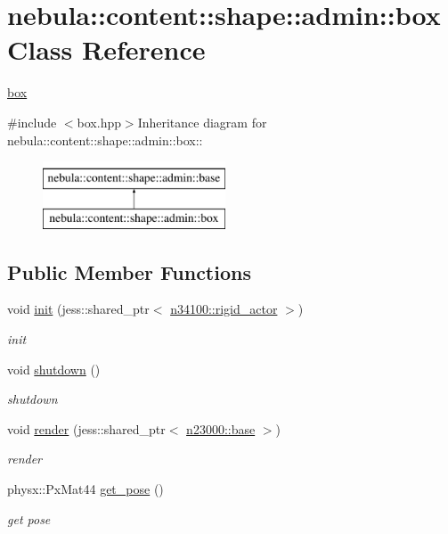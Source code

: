 \hypertarget{classnebula_1_1content_1_1shape_1_1admin_1_1box}{
\section{nebula::content::shape::admin::box Class Reference}
\label{classnebula_1_1content_1_1shape_1_1admin_1_1box}
}


\hyperlink{classnebula_1_1content_1_1shape_1_1admin_1_1box}{box}  


{\ttfamily \#include $<$box.hpp$>$}Inheritance diagram for nebula::content::shape::admin::box::\begin{figure}[H]
\begin{center}
\leavevmode
\includegraphics[height=2cm]{classnebula_1_1content_1_1shape_1_1admin_1_1box}
\end{center}
\end{figure}
\subsection*{Public Member Functions}
\begin{DoxyCompactItemize}
\item 
void \hyperlink{classnebula_1_1content_1_1shape_1_1admin_1_1box_ade143fc2e0cf69ac51d898d4a2cb574d}{init} (jess::shared\_\-ptr$<$ \hyperlink{classnebula_1_1content_1_1actor_1_1admin_1_1rigid__actor}{n34100::rigid\_\-actor} $>$)
\begin{DoxyCompactList}\small\item\em init \item\end{DoxyCompactList}\item 
void \hyperlink{classnebula_1_1content_1_1shape_1_1admin_1_1box_a498fc0508fcdfc64a7e80141f623505d}{shutdown} ()
\begin{DoxyCompactList}\small\item\em shutdown \item\end{DoxyCompactList}\item 
void \hyperlink{classnebula_1_1content_1_1shape_1_1admin_1_1box_aee3c2f7f91c2d99ef1ea80b97dd5d04d}{render} (jess::shared\_\-ptr$<$ \hyperlink{classnebula_1_1platform_1_1renderer_1_1base}{n23000::base} $>$)
\begin{DoxyCompactList}\small\item\em render \item\end{DoxyCompactList}\item 
physx::PxMat44 \hyperlink{classnebula_1_1content_1_1shape_1_1admin_1_1box_a90262710172c5f4318565794f75939be}{get\_\-pose} ()
\begin{DoxyCompactList}\small\item\em get pose \item\end{DoxyCompactList}\end{DoxyCompactItemize}

